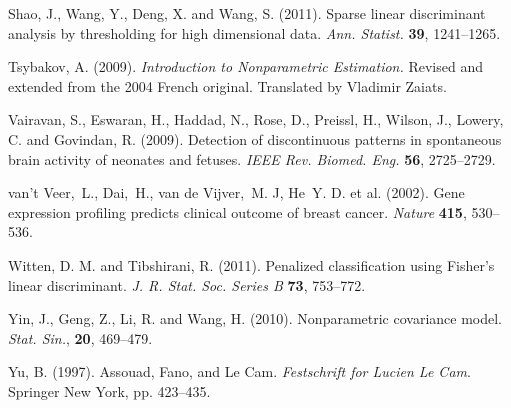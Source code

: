 \documentclass[11pt]{article}
\theoremstyle{definition}
\begin{document}
\begin{thebibliography}{}
 	
 	{Shao, J., Wang, Y., Deng, X.} and {Wang, S.}
 	(2011).  {Sparse linear discriminant analysis  by thresholding for high dimensional data.} \textit{Ann. Statist.} {\bf 39},
 	1241--1265.
 	
 	
 	{Tsybakov, A.} (2009). {\it Introduction to Nonparametric Estimation.} Revised and extended from the 2004 French original. Translated by Vladimir Zaiats.
 	
 	
 	{Vairavan, S.}, {Eswaran, H.}, {Haddad, N.}, {Rose, D.}, {Preissl, H.}, {Wilson, J.,}   {Lowery, C.} and {Govindan, R.} (2009).
 	Detection of discontinuous patterns in spontaneous brain activity of neonates and fetuses.
 	\textit{IEEE Rev. Biomed. Eng.} {\bf 56}, 2725--2729.
 	
 	
 	
 	{van't Veer,~L., Dai,~H., van de Vijver,~M. J, He~Y. D. et al.} (2002). Gene expression profiling predicts clinical outcome of breast cancer. \textit{Nature} {\bf 415}, 530--536.
 	
 	
 	
 	{Witten, D. M.} and {Tibshirani, R.} (2011). Penalized classification using Fisher's linear discriminant. \textit{J. R. Stat. Soc. Series B} {\bf 73}, 753--772.
 	
 	
 	{Yin, J.}, {Geng, Z.}, {Li, R.} and {Wang, H.} (2010).
 	Nonparametric covariance model.
 	\textit{Stat. Sin.},
 	{\bf 20}, 469--479.
 	
 	{Yu, B.} (1997). {Assouad, Fano, and Le Cam}.
 	{\it Festschrift for Lucien Le Cam}. Springer New York, pp. 423--435.
 	
 	
 \end{thebibliography}
\end{document}
